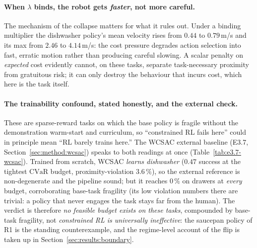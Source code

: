 \documentclass[11pt,a4paper]{report}
\newcommand{\cvar}{\ensuremath{\mathrm{CVaR}}}
\begin{document}
\paragraph{When $\lambda$ binds, the robot gets \emph{faster}, not more careful.}
The mechanism of the collapse matters for what it rules out. Under a
binding multiplier the dishwasher policy's mean velocity rises from
$0.44$ to $0.79$\,m/s and its max from $2.46$ to $4.14$\,m/s: the
cost pressure degrades action selection into fast, erratic motion
rather than producing careful slowing. A scalar penalty on
\emph{expected} cost evidently cannot, on these tasks, separate
task-necessary proximity from gratuitous risk; it can only destroy
the behaviour that incurs cost, which here is the task itself.

\paragraph{The trainability confound, stated honestly, and the external check.}
\label{sec:results:wcsac}
These are sparse-reward tasks on which the base policy is fragile
without the demonstration warm-start and curriculum, so ``constrained
RL fails here'' could in principle mean ``RL barely trains here.''
The WCSAC external baseline (E3.7, Section~\ref{sec:method:wcsac})
speaks to both readings at once (Table~\ref{tab:e3.7-wcsac}).
Trained from scratch, WCSAC \emph{learns dishwasher} ($0.47$ success
at the tightest \cvar{} budget, proximity-violation $3.6\,\%$), so
the external reference is non-degenerate and the pipeline sound; but
it reaches $0\,\%$ on drawers at \emph{every} budget, corroborating
base-task fragility (its low violation numbers there are trivial: a
policy that never engages the task stays far from the human). The
verdict is therefore \emph{no feasible budget exists on these
tasks}, compounded by base-task fragility, not \emph{constrained RL
is universally ineffective}: the saucepan policy of R1 is the
standing counterexample, and the regime-level account of the flip is
taken up in Section~\ref{sec:results:boundary}.
\end{document}
